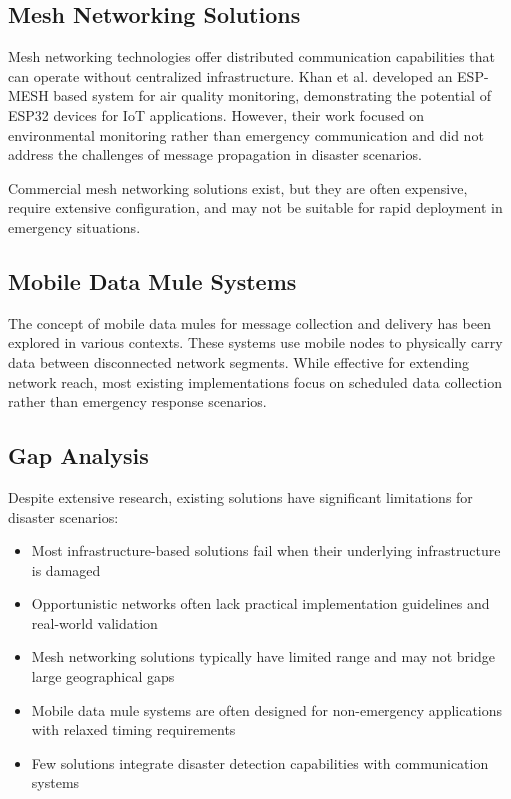 \documentclass[conference]{IEEEtran}
\begin{document}
\subsection{Mesh Networking Solutions}

Mesh networking technologies offer distributed communication capabilities that can operate without centralized infrastructure. Khan et al. \cite{Khan2022} developed an ESP-MESH based system for air quality monitoring, demonstrating the potential of ESP32 devices for IoT applications. However, their work focused on environmental monitoring rather than emergency communication and did not address the challenges of message propagation in disaster scenarios.

Commercial mesh networking solutions exist, but they are often expensive, require extensive configuration, and may not be suitable for rapid deployment in emergency situations.

\subsection{Mobile Data Mule Systems}

The concept of mobile data mules for message collection and delivery has been explored in various contexts. These systems use mobile nodes to physically carry data between disconnected network segments. While effective for extending network reach, most existing implementations focus on scheduled data collection rather than emergency response scenarios.

\subsection{Gap Analysis}

Despite extensive research, existing solutions have significant limitations for disaster scenarios:

\begin{itemize}
\item Most infrastructure-based solutions fail when their underlying infrastructure is damaged
\item Opportunistic networks often lack practical implementation guidelines and real-world validation
\item Mesh networking solutions typically have limited range and may not bridge large geographical gaps
\item Mobile data mule systems are often designed for non-emergency applications with relaxed timing requirements
\item Few solutions integrate disaster detection capabilities with communication systems
\end{itemize}
\end{document}
